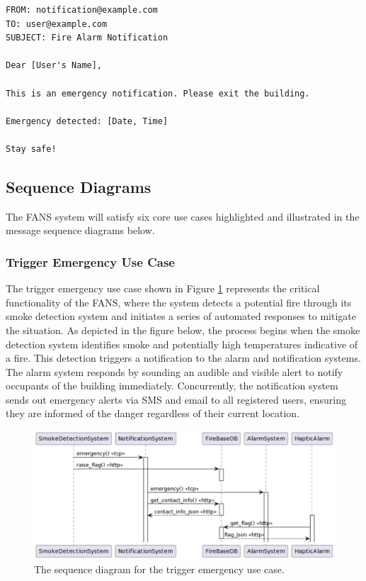 {
\tiny
\begin{lstlisting}[label={lst:email},caption={Email notification for detected emergency in FANS.}]
FROM: notification@example.com
TO: user@example.com
SUBJECT: Fire Alarm Notification

Dear [User's Name],

This is an emergency notification. Please exit the building.

Emergency detected: [Date, Time]

Stay safe!
\end{lstlisting}
}

\subsection{Sequence Diagrams}

The FANS system will satisfy six core use cases highlighted and illustrated in the message sequence diagrams below.

\subsubsection{Trigger Emergency Use Case}

The trigger emergency use case shown in Figure \ref{fig:trigger-emerg} represents the critical functionality of the
FANS, where the system detects a potential fire through its smoke detection system and initiates a series of automated
responses to mitigate the situation. As depicted in the figure below, the process begins when the smoke detection system 
identifies smoke and potentially high temperatures indicative of a fire. This detection triggers a notification to the 
alarm and notification systems. The alarm system responds by sounding an audible and visible alert to notify occupants 
of the building immediately. Concurrently, the notification system sends out emergency alerts via SMS and email to all 
registered users, ensuring they are informed of the danger regardless of their current location.

\begin{figure}
    \centering
    \includegraphics[width=\imagewidth]{../assets/sequence/TriggerEmergencyUseCaseSequenceDiagram.png}
    \caption{The sequence diagram for the trigger emergency use case.}
    \label{fig:trigger-emerg}
\end{figure}

